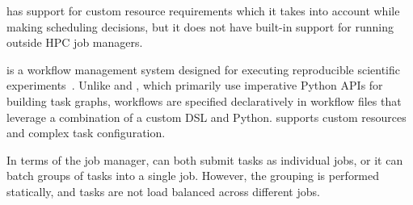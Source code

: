 \ray{} has support for custom resource requirements which it takes into account while making
scheduling decisions, but it does not have built-in support for running outside HPC job managers.

\snakemake{} is a workflow management system designed for executing reproducible
scientific experiments~\cite{snakemake}. Unlike \dask{} and \ray{}, which primarily use
imperative Python APIs for building task graphs, \snakemake{} workflows are specified declaratively
in workflow files that leverage a combination of a custom DSL and Python. \snakemake{} supports
custom resources and complex task configuration.

In terms of the job manager, \snakemake{} can both submit tasks as individual jobs, or it can
batch groups of tasks into a single job. However, the grouping is performed statically, and tasks
are not load balanced across different jobs.
%

